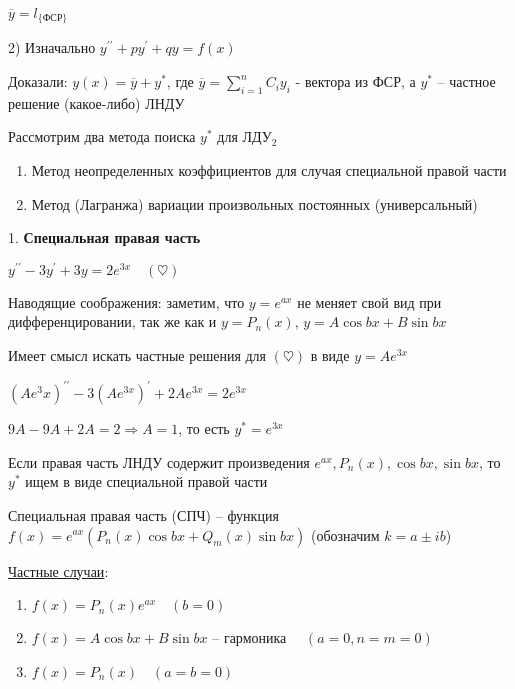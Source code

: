 \documentclass[12pt]{article}
\begin{document}
    $\overline{y} = l_{\{\text{ФСР}\}}$

    2) Изначально $y^{\prime\prime} + py^\prime + qy = f(x)$

    Доказали: $y(x) = \overline{y} + y^*$, где $\overline{y} = \sum_{i=1}^n C_i y_i$ - вектора из ФСР, а $y^*$ -- частное решение (какое-либо) ЛНДУ

    \Nota Рассмотрим два метода поиска $y^*$ для ЛДУ$_2$

    \begin{enumerate}
        \item Метод неопределенных коэффициентов для случая специальной правой части

        \item Метод (Лагранжа) вариации произвольных постоянных (универсальный)
    \end{enumerate}

    \mediumvspace

    \hypertarget{specialrightpart}{}

    1. \textbf{Специальная правая часть}

    \Ex $y^{\prime\prime} - 3y^\prime + 3y = 2e^{3x} \quad (\heartsuit)$

    Наводящие соображения: заметим, что $y = e^{ax}$ не меняет свой вид при дифференцировании,
    так же как и $y = P_n(x)$, $y = A\cos bx + B\sin bx$

    Имеет смысл искать частные решения для $(\heartsuit)$ в виде $y = Ae^{3x}$

    $(Ae^3x)^{\prime\prime} - 3(Ae^{3x})^\prime + 2Ae^{3x} = 2e^{3x}$

    $9A - 9A + 2A = 2 \Longrightarrow A = 1$, то есть $y^* = e^{3x}$

    \Nota Если правая часть ЛНДУ содержит произведения $e^{ax}, P_n(x), \cos bx, \sin bx$, то $y^*$ ищем в виде специальной правой части

    \Def Специальная правая часть (СПЧ) -- функция $f(x) = e^{ax} (P_n(x)\cos bx + Q_m (x)\sin bx)$ (обозначим $k = a \pm ib$)

    \underline{Частные случаи}:

    \begin{enumerate}
        \item $f(x) = P_n(x) e^{ax} \quad (b = 0)$

        \item $f(x) = A\cos b x + B \sin bx$ -- гармоника $\quad (a = 0, n = m = 0)$

        \item $f(x) = P_n(x) \quad (a = b = 0)$
    \end{enumerate}
\end{document}
